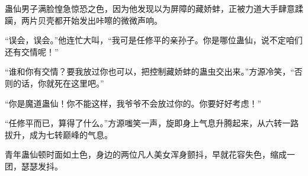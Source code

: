 \begin{this_body}
蛊仙男子满脸惶急惊恐之色，因为他发现以为屏障的藏娇蚌，正被力道大手肆意蹂躏，两片贝壳都开始发出咔嚓的微微声响。

“误会，误会。”他连忙大叫，“我可是任修平的亲孙子。你是哪位蛊仙，说不定咱们还有交情呢！”

“谁和你有交情？要我放过你也可以，把控制藏娇蚌的蛊虫交出来。”方源冷笑，“否则的话，你就死在这里吧。”

“你是魔道蛊仙！你不能这样，我爷爷不会放过你的。你要好好考虑！”

“任修平而已，算得了什么。”方源嗤笑一声，旋即身上气息升腾起来，从六转一路拔升，成为七转巅峰的气息。

青年蛊仙顿时面如土色，身边的两位凡人美女浑身颤抖，早就花容失色，缩成一团，瑟瑟发抖。

\end{this_body}

